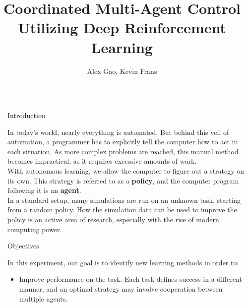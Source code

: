 \documentclass[final]{beamer}
\title{Coordinated Multi-Agent Control \\ Utilizing Deep Reinforcement Learning} %
\author{Alex Gao, Kevin Frans} %
\institute{Henry M. Gunn High School} %
\newlength{\sepwid}
\newlength{\onecolwid}
\begin{document}

\setlength{\belowcaptionskip}{2ex} %
\setlength\belowdisplayshortskip{2ex} %

\begin{frame}[t] %

\begin{columns}[t] %

\begin{column}{\sepwid}\end{column} %

\begin{column}{\onecolwid} %

\begin{block}{Introduction}

In today's world, nearly everything is automated. But behind this veil of automation, a programmer has to explicitly tell the computer how to act in each situation. As more complex problems are reached, this manual method becomes impractical, as it requires excessive amounts of work.
\\[12pt]
With autonomous learning, we allow the computer to figure out a strategy on its own. This strategy is referred to as a \textbf{policy}, and the computer program following it is an \textbf{agent}.
\\[12pt]
In a standard setup, many simulations are run on an unknown task, starting from a random policy. How the simulation data can be used to improve the policy is an active area of research, especially with the rise of modern computing power.
\end{block}

\begin{alertblock}{Objectives}

In this experiment, our goal is to identify new learning methods in order to:

    \begin{itemize}
    \item Improve performance on the task. Each task defines success in a different manner, and an optimal strategy may involve cooperation between multiple agents.


\end{itemize}
\end{alertblock}
\end{column}
\end{columns}
\end{frame}
\end{document}
